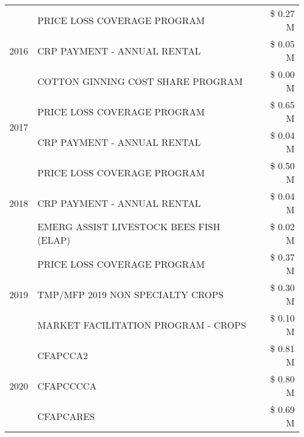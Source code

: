 \begin{tabular}{llr}
\cline{1-3}
\multirow[t]{3}{*}{2016} & PRICE LOSS COVERAGE PROGRAM & \$ 0.27 M \\
 & CRP PAYMENT - ANNUAL RENTAL & \$ 0.05 M \\
 & COTTON GINNING COST SHARE PROGRAM & \$ 0.00 M \\
\cline{1-3}
\multirow[t]{2}{*}{2017} & PRICE LOSS COVERAGE PROGRAM & \$ 0.65 M \\
 & CRP PAYMENT - ANNUAL RENTAL & \$ 0.04 M \\
\cline{1-3}
\multirow[t]{3}{*}{2018} & PRICE LOSS COVERAGE PROGRAM & \$ 0.50 M \\
 & CRP PAYMENT - ANNUAL RENTAL & \$ 0.04 M \\
 & EMERG ASSIST LIVESTOCK BEES FISH (ELAP) & \$ 0.02 M \\
\cline{1-3}
\multirow[t]{3}{*}{2019} & PRICE LOSS COVERAGE PROGRAM & \$ 0.37 M \\
 & TMP/MFP 2019 NON SPECIALTY CROPS & \$ 0.30 M \\
 & MARKET FACILITATION PROGRAM - CROPS & \$ 0.10 M \\
\cline{1-3}
\multirow[t]{3}{*}{2020} & CFAPCCA2 & \$ 0.81 M \\
 & CFAPCCCCA & \$ 0.80 M \\
 & CFAPCARES & \$ 0.69 M \\
\cline{1-3}
\bottomrule
\end{tabular}
